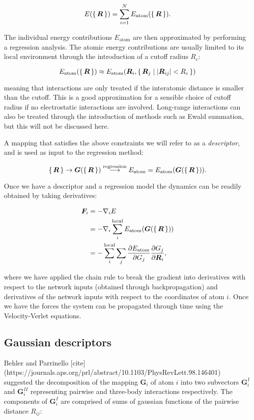 $$ E(\set{\bm{R}}) = \sum_{i=1}^N E_{\text{atom}}(\set{\bm{R}}) . $$

The individual energy contributions $E_{\text{atom}}$
are then approximated by performing a regression analysis.
The atomic energy contributions are usually limited to its
local environment through the introduction of a cutoff radius $R_c$:

$$ E_{\text{atom}} (\set{\bm{R}}) \approx
    E_{\text{atom}} (\bm{R}_i, \set{\bm{R}_j | \left| \bm{R}_{ij} \right| 
    < R_c}) $$

meaning that interactions are only treated if the interatomic distance
is smaller than the cutoff. This is a good approximation for a sensible
choice of cutoff radius if no electrostatic interactions are involved.
Long-range interactions can also be treated through
the introduction of methods such as Ewald summation, but this will
not be discussed here.
\par
A mapping that satisfies the above constraints we will refer to
as a \textit{descriptor}, and is used as input to the regression method:

$$ \set{\bm{R}} \rightarrow \bm{G}(\set{\bm{R}}) \overset{\text{regression}}
    {\longrightarrow} E_{\text{atom}} = 
    E_{\text{atom}}(\bm{G}(\set{\bm{R}})). $$

Once we have a descriptor and a regression model the dynamics
can be readily obtained by taking derivatives:

\begin{equation}
\begin{split}
    \bm{F}_i &= -\nabla_i E \\
    &= -\nabla_i \sum_i^{\text{local}}
    E_{\text{atom}}(\bm{G}(\set{\bm{R}})) \\
    &= -\sum_i^{\text{local}} \sum_j \frac{\partial E_{\text{atom}}}
    {\partial G_j} \frac{\partial G_j}{\partial \bm{R}_i} ,
\end{split}
\end{equation}

where we have applied the chain rule to break the gradient
into derivatives with respect to the network inputs (obtained through
backpropagation) and derivatives of the network inputs with
respect to the coordinates of atom $i$.
Once we have the forces the system can be propagated through time
using the Velocity-Verlet equations.

\subsection{Gaussian descriptors}
Behler and Parrinello [cite](https://journals.aps.org/prl/abstract/10.1103/PhysRevLett.98.146401)
suggested the decomposition of the mapping $\bm{G}_i$ of atom $i$
into two subvectors $\bm{G}_i^I$ and $\bm{G}_i^{II}$ representing
pairwise and three-body interactions respectively.
The components of $\bm{G}_i^I$ are comprised of
sums of gaussian functions of the pairwise distance $R_{ij}$:

